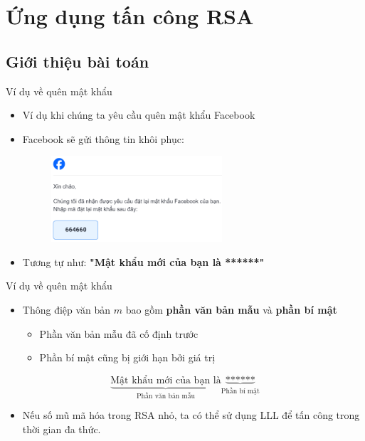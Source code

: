 \section{Ứng dụng tấn công RSA}

\subsection{Giới thiệu bài toán}

\begin{frame}{Ví dụ về quên mật khẩu}

\begin{itemize}
\item Ví dụ khi chúng ta yêu cầu quên mật khẩu Facebook
\item Facebook sẽ gửi thông tin khôi phục:

\begin{figure}[h]
\includegraphics[width=0.6\textwidth]{pictures/facebook.png}
\end{figure}

\item Tương tự như: \textbf{"Mật khẩu mới của bạn là ******"}
\end{itemize}

\end{frame}
\begin{frame}{Ví dụ về quên mật khẩu}

\begin{itemize}
\item Thông điệp văn bản \(m \) bao gồm \textbf{phần văn bản mẫu} và \textbf{phần bí mật}

\begin{itemize}
\item Phần văn bản mẫu đã cố định trước
\item Phần bí mật cũng bị giới hạn bởi giá trị
\end{itemize}

\end{itemize}

$$
\underbrace{\text{Mật khẩu mới của bạn là}}_{\text{Phần văn bản mẫu}}
\underbrace{\text{******}}_{\text{Phần bí mật}}
$$

\begin{itemize}
\item Nếu số mũ mã hóa trong RSA nhỏ, ta có thể sử dụng LLL để tấn công trong thời gian đa thức.
\end{itemize}

\end{frame}
